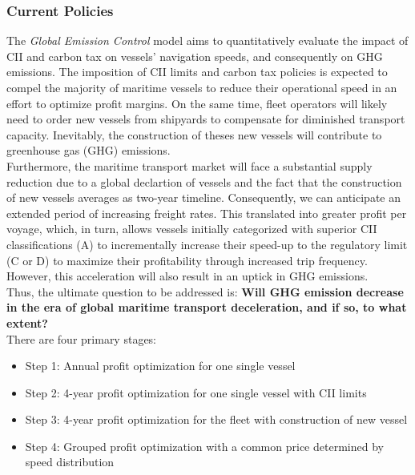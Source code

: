 \documentclass[a4paper,12pt]{article}
\begin{document}
\subsubsection{Current Policies}
The \textit{Global Emission Control} model aims to quantitatively evaluate the impact of CII and carbon tax on vessels' navigation speeds, and consequently on GHG emissions.
The imposition of CII limits and carbon tax policies is expected to compel the majority of maritime vessels to reduce their operational speed in an effort to optimize profit margins.
On the same time, fleet operators will likely need to order new vessels from shipyards to compensate for diminished transport capacity.
Inevitably, the construction of theses new vessels will contribute to greenhouse gas (GHG) emissions.\\

Furthermore, the maritime transport market will face a substantial supply reduction due to a global declartion of vessels and the fact that the construction of new vessels averages as two-year timeline.
Consequently, we can anticipate an extended period of increasing freight rates.
This translated into greater profit per voyage, which, in turn, allows vessels initially categorized with superior CII classifications (A) to incrementally increase their speed-up to the regulatory limit (C or D) to maximize their profitability through increased trip frequency.
However, this acceleration will also result in an uptick in GHG emissions.\\

Thus, the ultimate question to be addressed is: \textbf{Will GHG emission decrease in the era of global maritime transport deceleration, and if so, to what extent?}\\

There are four primary stages:
\begin{itemize}
	\item Step 1: Annual profit optimization for one single vessel
	\item Step 2: 4-year profit optimization for one single vessel with CII limits
	\item Step 3: 4-year profit optimization for the fleet with construction of new vessel
	\item Step 4: Grouped profit optimization with a common price determined by speed distribution \\
\end{itemize}
\end{document}
